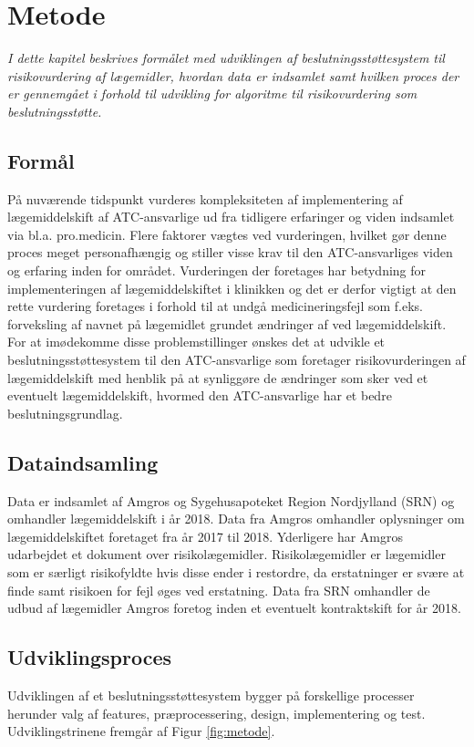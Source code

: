 \chapter{Metode}
\textit{I dette kapitel beskrives formålet med udviklingen af beslutningsstøttesystem til risikovurdering af lægemidler, hvordan data er indsamlet samt hvilken proces der er gennemgået i forhold til udvikling for algoritme til risikovurdering som beslutningsstøtte.}

\section{Formål}
På nuværende tidspunkt vurderes kompleksiteten af implementering af lægemiddelskift af ATC-ansvarlige ud fra tidligere erfaringer og viden indsamlet via bl.a. pro.medicin. Flere faktorer vægtes ved vurderingen, hvilket gør denne proces meget personafhængig og stiller visse krav til den ATC-ansvarliges viden og erfaring inden for området. Vurderingen der foretages har betydning for implementeringen af lægemiddelskiftet i klinikken og det er derfor vigtigt at den rette vurdering foretages i forhold til at undgå medicineringsfejl som f.eks. forveksling af navnet på lægemidlet grundet ændringer af ved lægemiddelskift. 
For at imødekomme disse problemstillinger ønskes det at udvikle et beslutningsstøttesystem til den ATC-ansvarlige som foretager risikovurderingen af lægemiddelskift med henblik på at synliggøre de ændringer som sker ved et eventuelt lægemiddelskift, hvormed den ATC-ansvarlige har et bedre beslutningsgrundlag.

\section{Dataindsamling}
Data er indsamlet af Amgros og Sygehusapoteket Region Nordjylland (SRN) og omhandler lægemiddelskift i år 2018. Data fra Amgros omhandler oplysninger om lægemiddelskiftet foretaget fra år 2017 til 2018. Yderligere har Amgros udarbejdet et dokument over risikolægemidler. Risikolægemidler er lægemidler som er særligt risikofyldte hvis disse ender i restordre, da erstatninger er svære at finde samt risikoen for fejl øges ved erstatning. Data fra SRN omhandler de udbud af lægemidler Amgros foretog inden et eventuelt kontraktskift for år 2018. 


\section{Udviklingsproces}
Udviklingen af et beslutningsstøttesystem bygger på forskellige processer herunder valg af features, præprocessering, design, implementering og test. Udviklingstrinene fremgår af Figur \ref{fig:metode}.

